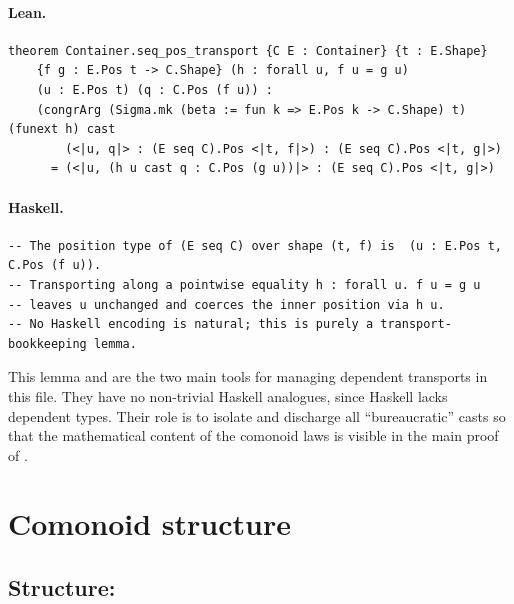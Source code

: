 \documentclass[11pt,a4paper]{article}
\begin{document}
\paragraph{Lean.}
\begin{lstlisting}[style=lean]
theorem Container.seq_pos_transport {C E : Container} {t : E.Shape}
    {f g : E.Pos t -> C.Shape} (h : forall u, f u = g u)
    (u : E.Pos t) (q : C.Pos (f u)) :
    (congrArg (Sigma.mk (beta := fun k => E.Pos k -> C.Shape) t) (funext h) cast
        (<|u, q|> : (E seq C).Pos <|t, f|>) : (E seq C).Pos <|t, g|>)
      = (<|u, (h u cast q : C.Pos (g u))|> : (E seq C).Pos <|t, g|>)
\end{lstlisting}

\paragraph{Haskell.}
\begin{lstlisting}[style=haskell]
-- The position type of (E seq C) over shape (t, f) is  (u : E.Pos t, C.Pos (f u)).
-- Transporting along a pointwise equality h : forall u. f u = g u
-- leaves u unchanged and coerces the inner position via h u.
-- No Haskell encoding is natural; this is purely a transport-bookkeeping lemma.
\end{lstlisting}

\begin{fidelitynote}
This lemma and  are the two main tools for
managing dependent transports in this file.  They have no non-trivial Haskell
analogues, since Haskell lacks dependent types.  Their role is to isolate and
discharge all ``bureaucratic'' casts so that the mathematical content of the
comonoid laws is visible in the main proof of .
\end{fidelitynote}


\section{Comonoid structure}

\subsection{Structure: }
\end{document}
